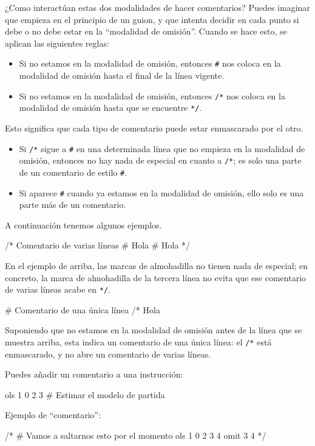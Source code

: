 ¿Como interactúan estas dos modalidades de hacer comentarios? Puedes imaginar
que  empieza en el principio de un guion, y que intenta decidir en
cada punto si debe o no debe estar en la ``modalidad de omisión''. Cuando
se hace esto, se aplican las siguientes reglas:

\begin{itemize}
\item Si no estamos en la modalidad de omisión, entonces \texttt{\#} nos coloca
  en la modalidad de omisión hasta el final de la línea vigente.
\item Si no estamos en la modalidad de omisión, entonces \texttt{/*} nos coloca
  en la modalidad de omisión hasta que se encuentre \texttt{*/}.
\end{itemize}

Esto significa que cada tipo de comentario puede estar enmascarado por el otro.

\begin{itemize}
\item Si \texttt{/*} sigue a \texttt{\#} en una determinada línea que no
  empieza en la modalidad de omisión, entonces no hay nada de especial en
  cuanto a \texttt{/*}; es solo una parte de un comentario de estilo \texttt{\#}.
\item Si aparece \texttt{\#} cuando ya estamos en la modalidad de omisión,
  ello solo es una parte más de un comentario.
\end{itemize}

A continuación tenemos algunos ejemplos.
%
\begin{code}
/* Comentario de varias líneas
   # Hola
   # Hola */
\end{code}
%
En el ejemplo de arriba, las marcas de almohadilla no tienen nada de especial;
en concreto, la marca de almohadilla de la tercera línea no evita que ese
comentario de varias líneas acabe en \texttt{*/}.
%
\begin{code}
# Comentario de una única línea /* Hola
\end{code}
%
Suponiendo que no estamos en la modalidad de omisión antes de la línea que
se muestra arriba, esta indica un comentario de una única línea: el
\texttt{/*} está enmascarado, y no abre un comentario de varias líneas.

Puedes añadir un comentario a una instrucción:
%
\begin{code}
ols 1 0 2 3 # Estimar el modelo de partida
\end{code}
%
Ejemplo de ``comentario'':
%
\begin{code}
/*
# Vamos a saltarnos esto por el momento
ols 1 0 2 3 4
omit 3 4
*/
\end{code}
%
